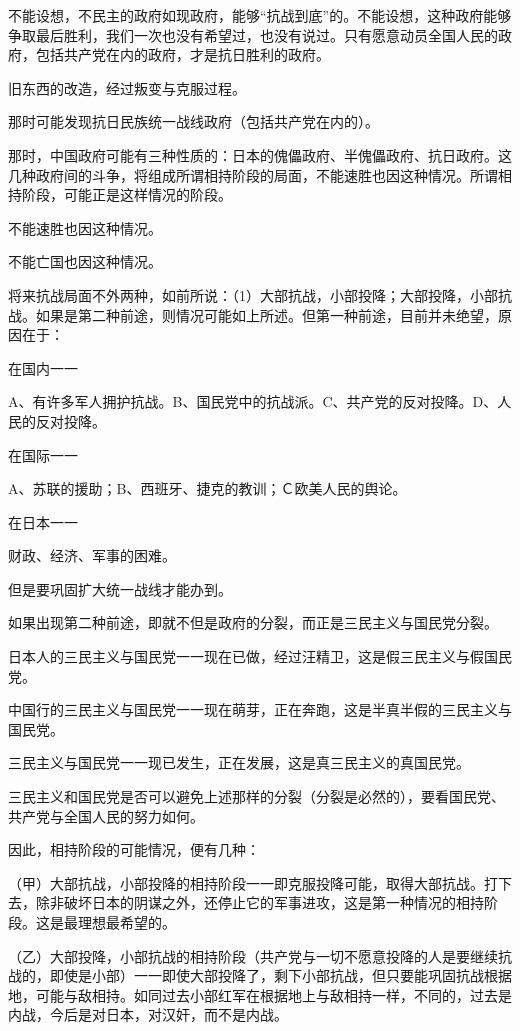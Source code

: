 不能设想，不民主的政府如现政府，能够“抗战到底”的。不能设想，这种政府能够争取最后胜利，我们一次也没有希望过，也没有说过。只有愿意动员全国人民的政府，包括共产党在内的政府，才是抗日胜利的政府。

旧东西的改造，经过叛变与克服过程。

那时可能发现抗日民族统一战线政府（包括共产党在内的）。

那时，中国政府可能有三种性质的：日本的傀儡政府、半傀儡政府、抗日政府。这几种政府间的斗争，将组成所谓相持阶段的局面，不能速胜也因这种情况。所谓相持阶段，可能正是这样情况的阶段。

不能速胜也因这种情况。

不能亡国也因这种情况。

将来抗战局面不外两种，如前所说：（1）大部抗战，小部投降；大部投降，小部抗战。如果是第二种前途，则情况可能如上所述。但第一种前途，目前并未绝望，原因在于：

在国内一一

A、有许多军人拥护抗战。B、国民党中的抗战派。C、共产党的反对投降。D、人民的反对投降。

在国际一一

A、苏联的援助；B、西班牙、捷克的教训；Ｃ欧美人民的舆论。

在日本一一

财政、经济、军事的困难。

但是要巩固扩大统一战线才能办到。

如果出现第二种前途，即就不但是政府的分裂，而正是三民主义与国民党分裂。

日本人的三民主义与国民党一一现在已做，经过汪精卫，这是假三民主义与假国民党。

中国行的三民主义与国民党一一现在萌芽，正在奔跑，这是半真半假的三民主义与国民党。

三民主义与国民党一一现已发生，正在发展，这是真三民主义的真国民党。

三民主义和国民党是否可以避免上述那样的分裂（分裂是必然的），要看国民党、共产党与全国人民的努力如何。

因此，相持阶段的可能情况，便有几种：

（甲）大部抗战，小部投降的相持阶段一一即克服投降可能，取得大部抗战。打下去，除非破坏日本的阴谋之外，还停止它的军事进攻，这是第一种情况的相持阶段。这是最理想最希望的。

（乙）大部投降，小部抗战的相持阶段（共产党与一切不愿意投降的人是要继续抗战的，即使是小部）一一即使大部投降了，剩下小部抗战，但只要能巩固抗战根据地，可能与敌相持。如同过去小部红军在根据地上与敌相持一样，不同的，过去是内战，今后是对日本，对汉奸，而不是内战。

